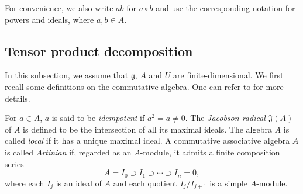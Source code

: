 \documentclass[12pt]{article}
\numberwithin{equation}{section}
\theoremstyle{definition}
\theoremstyle{plain}
\newcommand{\fg}{\mathfrak{g}}
\newcommand{\fJ}{\mathfrak{J}}
\begin{document}
For convenience, we also write $ab$ for $a\circ b$ and use the corresponding notation for powers and ideals, where $a,b\in A$. 

\subsection{Tensor product decomposition}\label{sect:tensor.decomposition}
\hspace{1.5em}In this subsection, we assume that $\fg$, $A$ and $U$ are finite-dimensional. We first recall some definitions on the commutative algebra. One can refer to \cite{AM} for more details. 

For $a\in A$, $a$ is said to be \emph{idempotent} if $a^2=a\neq0$. The \emph{Jacobson radical} $\fJ(A)$ of $A$ is defined to be the intersection of all its maximal ideals. The algebra $A$ is called \emph{local} if it has a unique maximal ideal. A commutative associative algebra $A$ is called \emph{Artinian} if, regarded as an $A$-module, it admits a finite composition series
\begin{equation*}
    A=I_0\supset I_1\supset\cdots\supset I_n=0,
\end{equation*}
where each $I_j$ is an ideal of $A$ and each quotient $I_j/I_{j+1}$ is a simple $A$-module.
\end{document}
